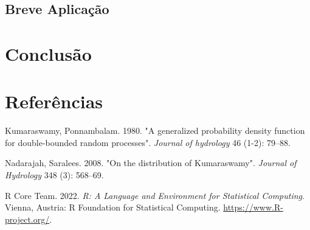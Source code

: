 \documentclass[
]{article}
\newlength{\cslhangindent}
\newlength{\cslentryspacingunit} %
\newenvironment{CSLReferences}[2] %
 {%
  \setlength{\parindent}{0pt}
  \ifodd #1
  \let\oldpar\par
  \def\par{\hangindent=\cslhangindent\oldpar}
  \fi
  \setlength{\parskip}{#2\cslentryspacingunit}
 }%
 {}
\begin{document}
\subsection{Breve Aplicação}

\section{\centering Conclusão}

\section{\centering Referências}

\hypertarget{refs}{}
\begin{CSLReferences}{1}{0}
\leavevmode{}%
Kumaraswamy, Ponnambalam. 1980. {"A generalized probability density
function for double-bounded random processes"}. \emph{Journal of
hydrology} 46 (1-2): 79--88.

\leavevmode{}%
Nadarajah, Saralees. 2008. {"On the distribution of Kumaraswamy"}.
\emph{Journal of Hydrology} 348 (3): 568--69.

\leavevmode{}%
R Core Team. 2022. \emph{R: A Language and Environment for Statistical
Computing}. Vienna, Austria: R Foundation for Statistical Computing.
\url{https://www.R-project.org/}.

\end{CSLReferences}
\end{document}
